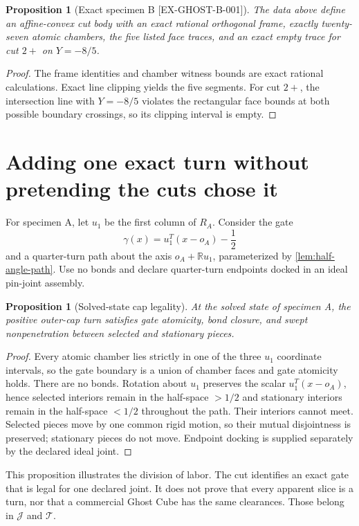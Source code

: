 \documentclass[11pt,openany]{book}
\newcommand{\R}{\mathbb R}
\newcommand{\Turns}{\mathcal T}
\newcommand{\claimid}[1]{\textnormal{\sffamily\footnotesize[#1]}}
\theoremstyle{polyplain}
\newtheorem{proposition}[theorem]{Proposition}
\theoremstyle{polydef}
\begin{document}
\begin{proposition}[Exact specimen B \claimid{EX-GHOST-B-001}]
The data above define an affine-convex cut body with an exact rational orthogonal frame, exactly twenty-seven atomic chambers, the five listed face traces, and an exact empty trace for cut $2+$ on $Y=-8/5$.
\end{proposition}

\begin{proof}
The frame identities and chamber witness bounds are exact rational calculations. Exact line clipping yields the five segments. For cut $2+$, the intersection line with $Y=-8/5$ violates the rectangular face bounds at both possible boundary crossings, so its clipping interval is empty.
\end{proof}

\section{Adding one exact turn without pretending the cuts chose it}

For specimen A, let $u_1$ be the first column of $R_A$. Consider the gate
\[
\gamma(x)=u_1^T(x-o_A)-\frac12
\]
and a quarter-turn path about the axis $o_A+\R u_1$, parameterized by \cref{lem:half-angle-path}. Use no bonds and declare quarter-turn endpoints docked in an ideal pin-joint assembly.

\begin{proposition}[Solved-state cap legality]
At the solved state of specimen A, the positive outer-cap turn satisfies gate atomicity, bond closure, and swept nonpenetration between selected and stationary pieces.
\end{proposition}

\begin{proof}
Every atomic chamber lies strictly in one of the three $u_1$ coordinate intervals, so the gate boundary is a union of chamber faces and gate atomicity holds. There are no bonds. Rotation about $u_1$ preserves the scalar $u_1^T(x-o_A)$, hence selected interiors remain in the half-space $>1/2$ and stationary interiors remain in the half-space $<1/2$ throughout the path. Their interiors cannot meet. Selected pieces move by one common rigid motion, so their mutual disjointness is preserved; stationary pieces do not move. Endpoint docking is supplied separately by the declared ideal joint.
\end{proof}

This proposition illustrates the division of labor. The cut identifies an exact gate that is legal for one declared joint. It does not prove that every apparent slice is a turn, nor that a commercial Ghost Cube has the same clearances. Those belong in $\mathcal J$ and $\Turns$.
\end{document}
